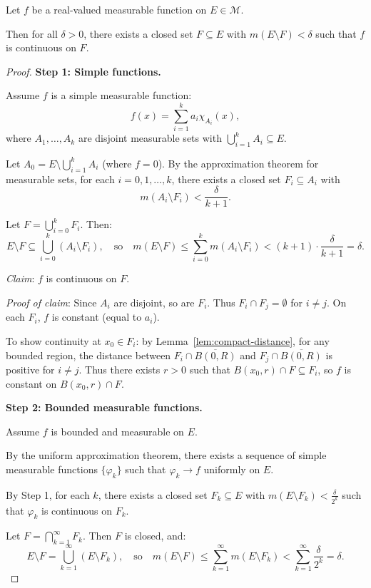 \documentclass[11pt]{report}
\begin{document}
\begin{thmbox}
Let $f$ be a real-valued measurable function on $E \in \mathcal{M}$.

Then for all $\delta > 0$, there exists a closed set $F \subseteq E$ with $m(E \setminus F) < \delta$ such that $f$ is continuous on $F$.
\end{thmbox}

\begin{proof}
\textbf{Step 1: Simple functions.}

Assume $f$ is a simple measurable function:
\[
f(x) = \sum_{i=1}^{k} a_i \chi_{A_i}(x),
\]
where $A_1, \ldots, A_k$ are disjoint measurable sets with $\bigcup_{i=1}^{k} A_i \subseteq E$.

Let $A_0 = E \setminus \bigcup_{i=1}^{k} A_i$ (where $f = 0$). By the approximation theorem for measurable sets, for each $i = 0, 1, \ldots, k$, there exists a closed set $F_i \subseteq A_i$ with
\[
m(A_i \setminus F_i) < \frac{\delta}{k+1}.
\]

Let $F = \bigcup_{i=0}^{k} F_i$. Then:
\[
E \setminus F \subseteq \bigcup_{i=0}^{k} (A_i \setminus F_i), \quad \text{so} \quad m(E \setminus F) \leq \sum_{i=0}^{k} m(A_i \setminus F_i) < (k+1) \cdot \frac{\delta}{k+1} = \delta.
\]

\textit{Claim}: $f$ is continuous on $F$.

\textit{Proof of claim}: Since $A_i$ are disjoint, so are $F_i$. Thus $F_i \cap F_j = \emptyset$ for $i \neq j$. On each $F_i$, $f$ is constant (equal to $a_i$).

To show continuity at $x_0 \in F_i$: by Lemma~\ref{lem:compact-distance}, for any bounded region, the distance between $F_i \cap \overline{B(0, R)}$ and $F_j \cap \overline{B(0, R)}$ is positive for $i \neq j$. Thus there exists $r > 0$ such that $B(x_0, r) \cap F \subseteq F_i$, so $f$ is constant on $B(x_0, r) \cap F$.

\textbf{Step 2: Bounded measurable functions.}

Assume $f$ is bounded and measurable on $E$.

By the uniform approximation theorem, there exists a sequence of simple measurable functions $\{\varphi_k\}$ such that $\varphi_k \to f$ uniformly on $E$.

By Step 1, for each $k$, there exists a closed set $F_k \subseteq E$ with $m(E \setminus F_k) < \frac{\delta}{2^k}$ such that $\varphi_k$ is continuous on $F_k$.

Let $F = \bigcap_{k=1}^{\infty} F_k$. Then $F$ is closed, and:
\[
E \setminus F = \bigcup_{k=1}^{\infty} (E \setminus F_k), \quad \text{so} \quad m(E \setminus F) \leq \sum_{k=1}^{\infty} m(E \setminus F_k) < \sum_{k=1}^{\infty} \frac{\delta}{2^k} = \delta.
\]


\end{proof}
\end{document}

